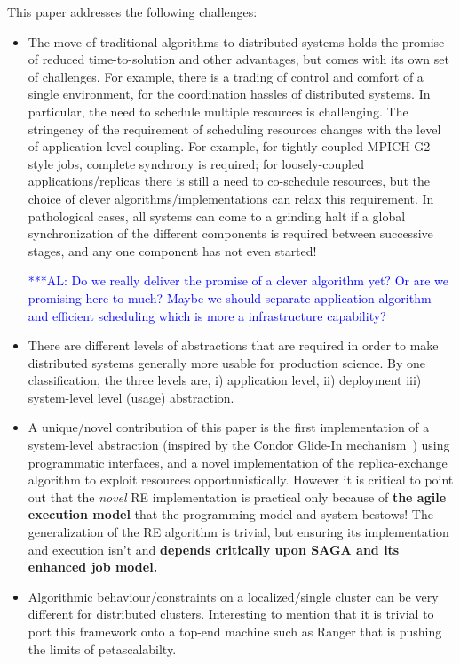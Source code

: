 \documentclass{rspublic}
\newcommand{\alnote}[1]{ {\textcolor{blue} { ***AL: #1 }}}
\newcommand{\alnote}[1]{}
\begin{document}
This paper addresses the following challenges:                 
\begin{itemize}

\item The move of traditional algorithms to distributed systems holds
  the promise of reduced time-to-solution and other advantages, but
  comes with its own set of challenges. For example, there is a
  trading of control and comfort of a single environment, for the
  coordination hassles of distributed systems. In particular, the need
  to schedule multiple resources is challenging. The stringency of the
  requirement of scheduling resources changes with the level of
  application-level coupling. For example, for tightly-coupled
  MPICH-G2 style jobs, complete synchrony is required; for
  loosely-coupled applications/replicas there is still a need to
  co-schedule resources, but the choice of clever
  algorithms/implementations can relax this requirement. In
  pathological cases, all systems can come to a grinding halt if a
  global synchronization of the different components is required
  between successive stages, and any one component has not even
  started!  
  
  \alnote{Do we really deliver the promise of a clever algorithm yet? Or are we
  promising here to much? Maybe we should separate application algorithm and efficient
  scheduling which is more a infrastructure capability?}

\item There are different levels of abstractions  that are required
  in order to make distributed systems generally more usable for
  production science. By one classification, the three levels are, 
  i) application level, ii) deployment iii) system-level
  level (usage) abstraction.

\item A unique/novel contribution of this paper is the first
  implementation of a system-level abstraction (inspired by the Condor 
  Glide-In mechanism~\citep{citeulike:291860})
  using programmatic interfaces, and a novel implementation of the
  replica-exchange algorithm to exploit resources opportunistically.
  However it is critical to point out that the {\it novel} RE
  implementation is practical only because of {\bf the agile execution
  model} that the programming model and system bestows! The
  generalization of the RE algorithm is trivial, but ensuring its
  implementation and execution isn't and {\bf depends critically upon
    SAGA and its enhanced job model.}

\item Algorithmic behaviour/constraints on a localized/single cluster
  can be very different for distributed clusters. Interesting to
  mention that it is trivial to port this framework onto a top-end
  machine such as Ranger that is pushing the limits of petascalabilty.

\end{itemize}
          
\end{document}
